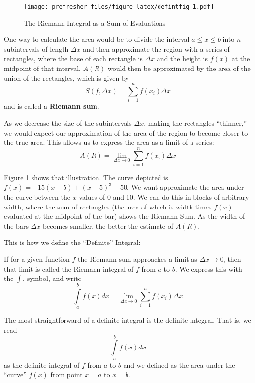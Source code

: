 \documentclass[]{book}
\theoremstyle{definition}
\theoremstyle{definition}
\theoremstyle{definition}
\theoremstyle{remark}
\let\BeginKnitrBlock\begin \let\EndKnitrBlock\end
\begin{document}
\begin{figure}
\centering
\texttt{[image: prefresher\_files/figure-latex/defintfig-1.pdf]}
\caption{\label{fig:defintfig}The Riemann Integral as a Sum of Evaluations}
\end{figure}

One way to calculate the area would be to divide the interval \(a\le x\le b\) into \(n\) subintervals of length \(\Delta x\) and then approximate the region with a series of rectangles, where the base of each rectangle is \(\Delta x\) and the height is \(f(x)\) at the midpoint of that interval. \(A(R)\) would then be approximated by the area of the union of the rectangles, which is given by \[S(f,\Delta x)=\sum\limits_{i=1}^n f(x_i)\Delta x\] and is called a \textbf{Riemann sum}.

As we decrease the size of the subintervals \(\Delta x\), making the rectangles ``thinner,'' we would expect our approximation of the area of the region to become closer to the true area. This allows us to express the area as a limit of a series:
\[A(R)=\lim\limits_{\Delta x\to 0}\sum\limits_{i=1}^n f(x_i)\Delta x\]

Figure \ref{fig:defintfig} shows that illustration. The curve depicted is \(f(x) = -15(x - 5) + (x - 5)^3 + 50.\) We want approximate the area under the curve between the \(x\) values of 0 and 10. We can do this in blocks of arbitrary width, where the sum of rectangles (the area of which is width times \(f(x)\) evaluated at the midpoint of the bar) shows the Riemann Sum. As the width of the bars \(\Delta x\) becomes smaller, the better the estimate of \(A(R)\).

This is how we define the ``Definite'' Integral:

\BeginKnitrBlock{definition}[The Definite Integral (Riemann)]
\protect\hypertarget{def:unnamed-chunk-26}{}{\label{def:unnamed-chunk-26} {} }If for a given function \(f\) the Riemann sum approaches a limit as \(\Delta x \to 0\), then that limit is called the Riemann integral of \(f\) from \(a\) to \(b\). We express this with the \(\int\), symbol, and write \[\int\limits_a^b f(x) dx= \lim\limits_{\Delta x\to 0} \sum\limits_{i=1}^n f(x_i)\Delta x\]

The most straightforward of a definite integral is the definite integral. That is, we read
\[\int\limits_a^b f(x) dx\] as the definite integral of \(f\) from \(a\) to \(b\) and we defined as the area under the ``curve'' \(f(x)\) from point \(x=a\) to \(x=b\).
\EndKnitrBlock{definition}
\end{document}
